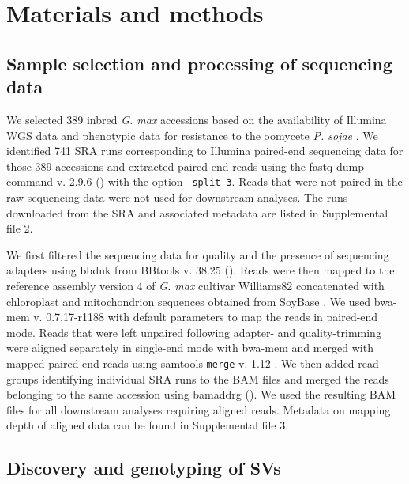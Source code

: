 \documentclass{article}
\begin{document}
\clearpage

\section*{Materials and methods}

\subsection*{Sample selection and processing of sequencing data}

We selected 389 inbred \emph{G. max} accessions based on the availability of
Illumina WGS data and phenotypic data for resistance to the oomycete \emph{P.
sojae} .  We identified 741 SRA runs corresponding to
Illumina paired-end sequencing data for those 389 accessions 
and extracted paired-end reads using the fastq-dump command v. 2.9.6
(\citeauthor{sratoolkit}) with the
option \texttt{-\-split-3}.
Reads that were not paired in the raw sequencing data were not used
for downstream analyses.  The runs downloaded from the SRA and associated
metadata are listed in Supplemental file 2.

We first filtered the sequencing data for quality and the presence of sequencing
adapters using bbduk from BBtools v. 38.25
(\citeauthor{bbtools}). Reads
were then mapped to the reference assembly version 4 of \emph{G. max}
cultivar Williams82  concatenated with chloroplast
and mitochondrion sequences obtained from SoyBase . We used
bwa-mem v. 0.7.17-r1188  with default parameters to map the
reads in paired-end mode. Reads that were left unpaired following adapter- and
quality-trimming were aligned separately in single-end mode with bwa-mem and
merged with mapped paired-end reads using samtools \texttt{merge}
v. 1.12 .  We then added read groups identifying
individual SRA runs to the BAM files and merged the reads belonging to the same
accession using bamaddrg
(\citeauthor{bamaddrg}). We used the
resulting BAM files for all downstream analyses requiring aligned reads.
Metadata on mapping depth of aligned data can be found in Supplemental file 3.

\subsection*{Discovery and genotyping of SVs}
\end{document}
